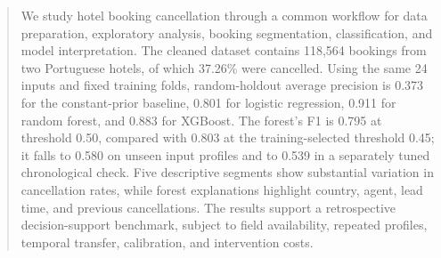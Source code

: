 \begin{abstract}
We study hotel booking cancellation through a common workflow for data preparation, exploratory analysis, booking segmentation, classification, and model interpretation. The cleaned dataset contains 118,564 bookings from two Portuguese hotels, of which 37.26\% were cancelled. Using the same 24 inputs and fixed training folds, random-holdout average precision is 0.373 for the constant-prior baseline, 0.801 for logistic regression, 0.911 for random forest, and 0.883 for XGBoost. The forest's F1 is 0.795 at threshold 0.50, compared with 0.803 at the training-selected threshold 0.45; it falls to 0.580 on unseen input profiles and to 0.539 in a separately tuned chronological check. Five descriptive segments show substantial variation in cancellation rates, while forest explanations highlight country, agent, lead time, and previous cancellations. The results support a retrospective decision-support benchmark, subject to field availability, repeated profiles, temporal transfer, calibration, and intervention costs.
\end{abstract}
